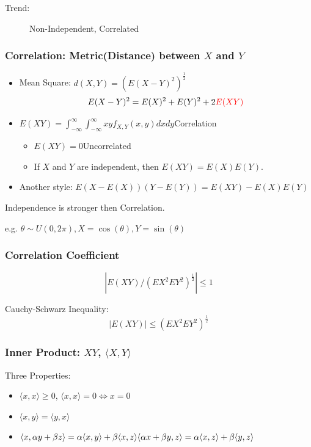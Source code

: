\documentclass[a4paper]{article}
\begin{document}
Trend:
\begin{figure}[H]
\centering
{}
\caption{Non-Independent, Correlated}
\end{figure}
\subsubsection*{Correlation: Metric(Distance) between $X$ and $Y$}
\begin{itemize}
  \item Mean Square: $d(X, Y) = (E(X-Y)^2)^{\frac 12}$
    $$E(X-Y)^2 = E(X)^2 + E(Y)^2 + 2{\color{red}E(XY)}$$
  \item $E(XY) = \int_{-\infty}^{\infty}\int_{-\infty}^{\infty}xyf_{X,Y}(x,y)dxdy$\quad Correlation
    \begin{itemize}
      \item $E(XY) = 0$\quad Uncorrelated
      \item If $X$ and $Y$ are independent, then $E(XY) = E(X)E(Y)$.
    \end{itemize}
  \item Another style: $E(X-E(X))(Y-E(Y))=E(XY)-E(X)E(Y)$
\end{itemize}
Independence is stronger then Correlation.

e.g. $\theta\sim U(0, 2\pi), X=\cos(\theta), Y=\sin(\theta)$
\subsubsection*{Correlation Coefficient}

$$|E(XY)/(EX^2EY^2)^{\frac 12}| \leq 1$$

Cauchy-Schwarz Inequality: $$|E(XY)|\leq(EX^2EY^2)^{\frac 12}$$

\subsubsection*{Inner Product: $XY$, $\langle X, Y\rangle$}

Three Properties:
\begin{itemize}
  \item $\langle x, x\rangle \geq 0$, $\langle x, x\rangle =0\Leftrightarrow x=0$
  \item $\langle x,y\rangle=\langle y,x\rangle$
  \item $\langle x, \alpha y+\beta z\rangle = \alpha\langle x, y\rangle + \beta\langle x, z\rangle\\ \langle \alpha x + \beta y, z\rangle =\alpha\langle x,z\rangle + \beta\langle y,z\rangle $
\end{itemize}
\end{document}
